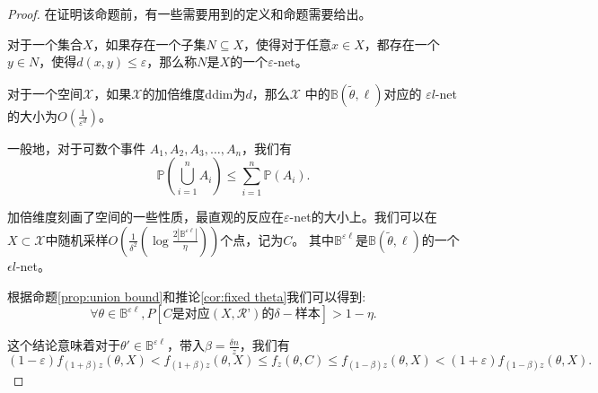 \begin{proof}
    在证明该命题前，有一些需要用到的定义和命题需要给出。

    \begin{definition}
        对于一个集合$X$，如果存在一个子集$N \subseteq X$，使得对于任意$x \in X$，都存在一个$y \in N$，使得$d(x, y) \leq \varepsilon$，那么称$N$是$X$的一个$\varepsilon$-net。
    \end{definition}

    \begin{proposition}
        对于一个空间$\mathcal{X}$，如果$\mathcal{X}$的加倍维度ddim为$d$，那么$\mathcal{X}$
        中的$\mathbb{B}(\tilde{\theta}, \ell)$对应的
        $\varepsilon l$-net的大小为$O\left(\frac{1}{\varepsilon^d}\right)$。
        \label{prop:net}
    \end{proposition}

    \begin{proposition}
        一般地，对于可数个事件 $A_1, A_2, A_3, \dots ,A_n$，我们有
        \begin{equation*}
            \mathbb{P} \left( \bigcup_{i=1}^{n} A_i \right) \leq \sum_{i=1}^{n} \mathbb{P}(A_i).
        \end{equation*}
        \label{prop:union bound}
    \end{proposition}
    加倍维度刻画了空间的一些性质，最直观的反应在$\varepsilon$-net的大小上。我们可以在
$X\subset \mathcal{X}$中随机采样$O\left(\frac{1}{\delta^2}\left(\log \frac{2|\mathbb{B}^{\varepsilon \ell}|}{\eta}\right)\right)$个点，记为$C$。
其中$\mathbb{B}^{\varepsilon \ell}$是$\mathbb{B}(\tilde{\theta}, \ell)$的一个$\epsilon l$-net。

根据命题\ref{prop:union bound}和推论\ref{cor:fixed theta}我们可以得到:
\begin{equation}
    \forall \theta \in \mathbb{B}^{\varepsilon \ell}, P\left[C\text{是对应}(X,\mathcal{R}’)\text{的}\delta-\text{样本}\right]>1-\eta.
\end{equation}

这个结论意味着对于$\theta' \in \mathbb{B}^{\varepsilon\ell}$，带入$\beta = \frac{\delta n }{z}$，我们有
\begin{equation*}
    (1-\varepsilon)f_{(1+\beta )z}(\theta, X) <
    f_{(1+\beta )z}(\theta, X) \leq 
    f_z(\theta, C) \leq f_{(1-\beta)z}(\theta, X) <
    (1+\varepsilon)f_{(1-\beta)z}(\theta, X).
\end{equation*}


\end{proof}
